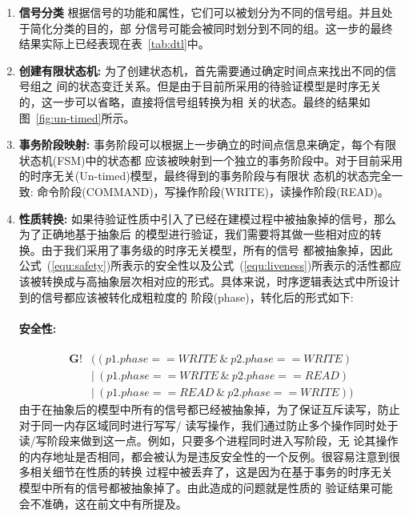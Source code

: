 \begin{enumerate}
\item {\bf 信号分类} 根据信号的功能和属性，它们可以被划分为不同的信号组。并且处于简化分类的目的，部
  分信号可能会被同时划分到不同的组。这一步的最终结果实际上已经表现在表~\ref{tab:dtl}中。
\item {\bf 创建有限状态机:} 为了创建状态机，首先需要通过确定时间点\cite{DATE09_Moll}来找出不同的信号组之
  间的状态变迁关系。但是由于目前所采用的待验证模型是时序无关的，这一步可以省略，直接将信号组转换为相
  关的状态。最终的结果如图~\ref{fig:un-timed}所示。
\item {\bf 事务阶段映射:} 事务阶段可以根据上一步确立的时间点信息来确定，每个有限状态机(FSM)中的状态都
  应该被映射到一个独立的事务阶段中。对于目前采用的时序无关(Un-timed)模型，最终得到的事务阶段与有限状
  态机的状态完全一致: 命令阶段(COMMAND)，写操作阶段(WRITE)，读操作阶段(READ)。
\item {\bf 性质转换:} 如果待验证性质中引入了已经在建模过程中被抽象掉的信号，那么为了正确地基于抽象后
  的模型进行验证，我们需要将其做一些相对应的转换。由于我们采用了事务级的时序无关模型，所有的信号
  都被抽象掉，因此公式~(\ref{equ:safety})所表示的安全性以及公式~(\ref{equ:liveness})所表示的活性都应
  该被转换成与高抽象层次相对应的形式。具体来说，时序逻辑表达式中所设计到的信号都应该被转化成粗粒度的
  阶段(phase)，转化后的形式如下:

 \paragraph{安全性:}
  \begin{equation} \label{equ:trans_safety}
    \begin{split}
      \mathbf{G}!&((p1.phase == WRITE\ \&\ p2.phase == WRITE) \\
      &|\ (p1.phase == WRITE \ \&\ p2.phase == READ) \\
      &|\ (p1.phase == READ \ \&\ p2.phase == WRITE))
   \end{split}
  \end{equation}
  由于在抽象后的模型中所有的信号都已经被抽象掉，为了保证互斥读写，防止对于同一内存区域同时进行写写/
  读写操作，我们通过防止多个操作同时处于读/写阶段来做到这一点。例如，只要多个进程同时进入写阶段，无
  论其操作的内存地址是否相同，都会被认为是违反安全性的一个反例。很容易注意到很多相关细节在性质的转换
  过程中被丢弃了，这是因为在基于事务的时序无关模型中所有的信号都被抽象掉了。由此造成的问题就是性质的
  验证结果可能会不准确，这在前文中有所提及。


\end{enumerate}
